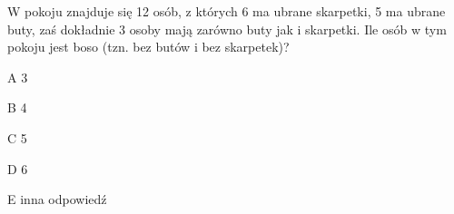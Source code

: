 \begin{tresc}
W pokoju znajduje się 12 osób, z których 6 ma ubrane skarpetki, 5 ma ubrane buty, zaś dokładnie 3 osoby mają zarówno buty jak i skarpetki. Ile osób w tym pokoju jest boso (tzn. bez butów i bez skarpetek)?
\end{tresc}
\begin{wariant}{A} 3 \end{wariant}
\begin{wariant}{B} 4 \end{wariant}
\begin{wariant}{C} 5 \end{wariant}
\begin{wariant}{D} 6 \end{wariant}
\begin{wariant}{E} inna odpowiedź \end{wariant}
